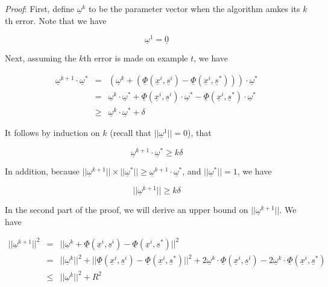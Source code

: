 \documentclass[12pt]{article}
\begin{document}
\textit {Proof}: First, define $\underline {\omega}^k$ to be the
parameter vector when the algorithm amkes its $k$th error. Note that
we have

\begin{equation*}
\underline {\omega}^1 = \underline {0}
\end{equation*}

Next, assuming the $k$th error is made on example $t$, we have

\begin{eqnarray*}
\underline {\omega}^{k+1} \cdot \underline {\omega}^*
&=& (\underline {\omega}^k + (\underline {\Phi} (\underline {x}^i,
\underline {s}^i) - \underline {\Phi} (\underline {x}^i, \underline
{s}^*))) \cdot \underline {\omega}^* \\
&=& \underline {\omega}^k \cdot \underline {\omega}^* + \underline
{\Phi} (\underline {x}^i, \underline {s}^i) \cdot \underline
{\omega}^* - \underline {\Phi} (\underline {x}^i, \underline {s}^*)
\cdot \underline {\omega}^* \\ 
&\ge& \underline {\omega}^k \cdot \underline {\omega}^* + \delta
\end{eqnarray*}

It follows by induction on $k$ (recall that $||\underline {\omega}^1||
=0$), that 

\begin{equation*}
\underline {\omega}^{k+1} \cdot \underline {\omega}^* \ge k \delta
\end{equation*}

In addition, because $||\underline {\omega}^{k+1}|| \times
||\underline {\omega}^*|| \ge \underline {\omega}^{k+1} \cdot
\underline {\omega}^*$, and $||\underline {\omega}^*|| = 1$, we have

\begin{equation*}
||\underline {\omega}^{k+1}|| \ge k \delta
\end{equation*}

In the second part of the proof, we will derive an upper bound on
$||\underline {\omega}^{k+1}||$. We have

\begin{eqnarray*}
||\underline {\omega}^{k+1}||^2
&=& ||\underline {\omega}^k + \underline {\Phi} (\underline {x}^i,
\underline {s}^i) - \underline {\Phi} (\underline {x}^i, \underline
{s}^*) ||^2 \\
&=& ||\underline {\omega}^k||^2 + || \underline {\Phi} (\underline {x}^i,
\underline {s}^i) - \underline {\Phi} (\underline {x}^i, \underline
{s}^*) ||^2 + 2 \underline {\omega}^k \cdot \underline {\Phi}
(\underline {x}^i, \underline {s}^i) - 2 \underline {\omega}^k \cdot
\underline {\Phi} (\underline {x}^i, \underline {s}^*) \\
&\le& ||\underline {\omega}^k||^2 + R^2
\end{eqnarray*}
\end{document}
